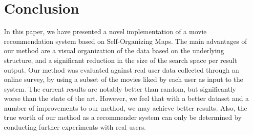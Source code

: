 \documentclass[conference]{IEEEtran}
\begin{document}
%





\section{Conclusion}
In this paper, we have presented a novel implementation of a movie recommendation system based on Self-Organizing Maps. The main advantages of our method are a visual organization of the data based on the underlying structure, and a significant reduction in the size of the search space per result output. Our method was evaluated against real user data collected through an online survey, by using a subset of the movies liked by each user as input to the system. The current results are notably better than random, but significantly worse than the state of the art. However, we feel that with a better dataset and a number of improvements to our method, we may achieve better results. Also, the true worth of our method as a recommender system can only be determined by conducting further experiments with real users.  
\end{document}
